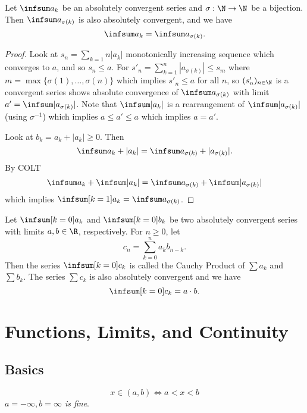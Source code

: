 \documentclass[10pt, a4paper]{article}
\newcommand{\seq}[1][x]{(#1_n)_{n \in \N}}
\begin{document}
\begin{theorem}
    Let $\infsum a_k$ be an absolutely convergent series and $\sigma : \N \to \N$ be a bijection.
    Then $\infsum a_{\sigma (k)}$ is also absolutely convergent,
    and we have
    \[
    \infsum a_k = \infsum a_{\sigma(k)}.
    \]
    \begin{proof}
        Look at $s_n = \sum_{k = 1}{n}|a_k|$ monotonically increasing sequence which converges to $a$,
        and so $s_n \leq a$.
        For $s'_n = \sum_{k = 1}^{n}|a_{\sigma(k)}| \leq s_m$ where $m = \max\{\sigma(1), \dotsc, \sigma(n)\}$ which implies $s'_n \leq a$ for all $n$,
        so $\seq[s']$ is a convergent series shows absolute convergence of $\infsum a_{\sigma(k)}$ with limit $a' = \infsum|a_{\sigma(k)}|$.
        Note that $\infsum|a_k|$ is a rearrangement of $\infsum|a_{\sigma(k)}|$
        (using $\sigma ^ {-1}$) which implies $a \leq a' \leq a$ which implies $a = a'$.

        Look at $b_k = a_k + |a_k| \geq 0$.
        Then
        \[
        \infsum a_k + |a_k| = \infsum a_{\sigma(k)} + |a_{\sigma(k)}|.
        \]
        By COLT
        \[
        \infsum a_k + \infsum|a_k| = \infsum a_{\sigma(k)} + \infsum|a_{\sigma(k)}|
        \]
        which implies $\infsum[k = 1]a_k = \infsum a_{\sigma(k)}$.
    \end{proof}
\end{theorem}

\begin{theorem}
    Let $\infsum[k = 0]a_k$ and $\infsum[k = 0]b_k$ be two absolutely convergent series with limits $a, b \in \R$,
    respectively.
    For $n \geq 0$,
    let
    \[
    c_n = \sum_{k = 0}^{n}a_kb_{n - k}.
    \]
    Then the series $\infsum[k = 0]c_k$ is called the Cauchy Product of $\sum a_k$ and $\sum b_k$.
    The series $\sum c_k$ is also absolutely convergent and we have
    \[
    \infsum[k = 0]c_k = a \cdot b.
    \]
\end{theorem}

\newpage

\section{Functions, Limits, and Continuity}

\subsection{Basics}

\begin{definition}
    \[
    x \in (a, b) \iff a < x < b
    \]
    \textit{$a = -\infty, b = \infty$ is fine}.
\end{definition}
\end{document}
